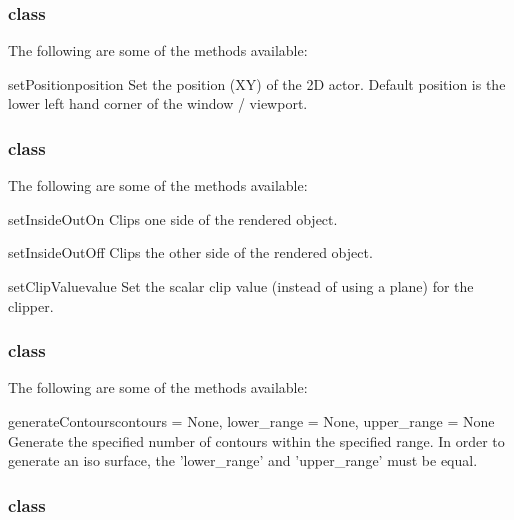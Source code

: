 \subsubsection{\ActorTwoD class}

The following are some of the methods available:

\begin{methoddesc}[Actor2D]{setPosition}{position}
Set the position (XY) of the 2D actor. Default position is the lower left hand
corner of the window / viewport.
\end{methoddesc}

\subsubsection{\Clipper class}

The following are some of the methods available:

\begin{methoddesc}[Clipper]{setInsideOutOn}{}
Clips one side of the rendered object.
\end{methoddesc}

\begin{methoddesc}[Clipper]{setInsideOutOff}{}
Clips the other side of the rendered object.
\end{methoddesc}

\begin{methoddesc}[Clipper]{setClipValue}{value}
Set the scalar clip value (instead of using a plane) for the clipper.
\end{methoddesc}

\subsubsection{\ContourModule class}

The following are some of the methods available:

\begin{methoddesc}[ContourModule]{generateContours}{contours = None, 
lower_range = None, upper_range = None}
Generate the specified number of contours within the specified range.
In order to generate an iso surface, the 'lower_range' and 'upper_range' 
must be equal.
\end{methoddesc}

\subsubsection{\GlyphThreeD class}

